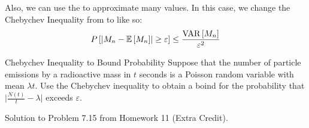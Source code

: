 	Also, we can use the  to approximate many values. In this case, we change the Chebychev Inequality from  to  like so:
		\begin{equation} \label{eq:Statistics Chebychev Inequality}
			P \left[ \lvert M_{n} - \operatorname{\operatorname{\mathbb{E}}} \left[ M_{n} \right] \rvert \geq \varepsilon \right] \leq \frac{\operatorname{\operatorname{VAR}} \left[ M_{n} \right]}{\varepsilon^{2}}
		\end{equation}
		\begin{example}[Problem 7.15]{Chebychev Inequality to Bound Probability}
                  Suppose that the number of particle emissions by a radioactive mass in $t$ seconds is a Poisson random variable with mean $\lambda t$.
                  Use the Chebychev inequality to obtain a boind for the probability that $\lvert \frac{N \left( t \right)}{t} - \lambda \rvert$ exceeds $\varepsilon$.

                  \tcblower

                  Solution to Problem 7.15 from Homework 11 (Extra Credit).
		\end{example}
		
